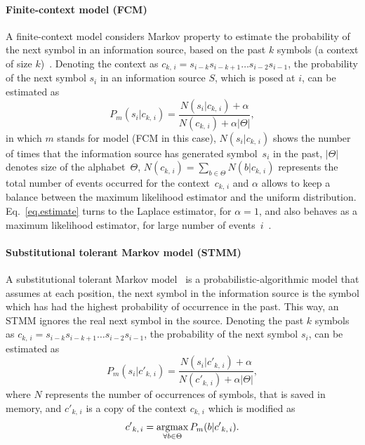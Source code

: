 \paragraph{Finite-context model (FCM)}
A finite-context model considers Markov property to estimate the probability of the next symbol in an information source, based on the past $k$ symbols (a context of size $k$)~\cite{sayood2017introduction,hosseini2019ac,pinho2013mfcompress}. Denoting the context as $c_{k,\,i} = s_{i-k} s_{i-k+1}\ldots s_{i-2} s_{i-1}$, the probability of the next symbol $s_i$ in an information source $S$, which is posed at $i$, can be estimated as
\begin{equation} \label{eq.estimate}
P_m(s_i|c_{k,\,i}) = \frac{N(s_i|c_{k,\,i})+\alpha}{N(c_{k,\,i})+ \alpha|\Theta|},
\end{equation}
in which $m$ stands for model (FCM in this case), $N(s_i|c_{k,\,i})$ shows the number of times that the information source has generated symbol~$s_i$ in the past, $|\Theta|$ denotes size of the alphabet~$\Theta$, $N(c_{k,\,i}) = \sum_{b \in \Theta} N(b|c_{k,\,i})$ represents the total number of events occurred for the context~$c_{k,\,i}$ and $\alpha$ allows to keep a balance between the maximum likelihood estimator and the uniform distribution. Eq.~\ref{eq.estimate} turns to the Laplace estimator, for $\alpha=1$, and also behaves as a maximum likelihood estimator, for large number of events~$i$~\cite{pratas2015alignment}.

\paragraph{Substitutional tolerant Markov model (STMM)}
A substitutional tolerant Markov model~\cite{pratas2017substitutional} is a probabilistic-algorithmic model that assumes at each position, the next symbol in the information source is the symbol which has had the highest probability of occurrence in the past. This way, an STMM ignores the real next symbol in the source. Denoting the past $k$ symbols as $c_{k,\,i} = s_{i-k} s_{i-k+1}\ldots s_{i-2} s_{i-1}$, the probability of the next symbol $s_i$, can be estimated as
\begin{equation}
P_m(s_i|{c'}_{k,\,i}) = \frac{N(s_i|{c'}_{k,\,i})+\alpha}{N({c'}_{k,\,i})+ \alpha|\Theta|},
\end{equation}
where $N$ represents the number of occurrences of symbols, that is saved in memory, and ${c'}_{k,\,i}$ is a copy of the context $c_{k,\,i}$ which is modified as 
\begin{equation}
{c'}_{k,\,i} = \operatorname*{argmax}_{\forall b\in \Theta}{P_m(b|{c'}_{k,\,i})}.
\end{equation}


